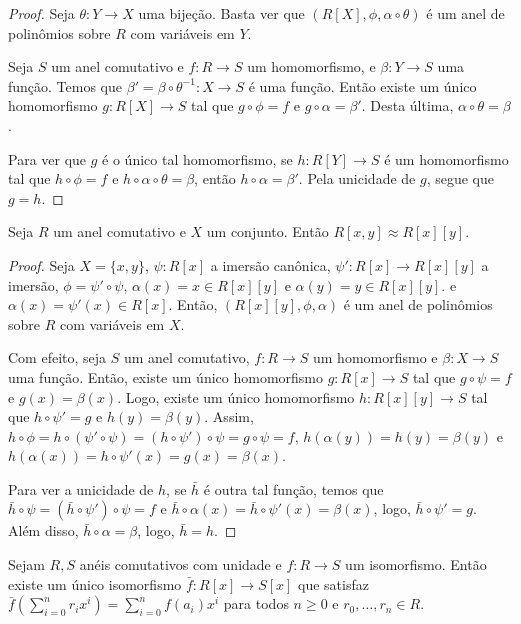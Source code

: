 \begin{proof}
Seja $\theta:Y\rightarrow X$ uma bijeção. Basta ver que $(R[X], \phi, \alpha\circ \theta)$ é um anel de polinômios sobre $R$ com variáveis em $Y$.

Seja $S$ um anel comutativo e $f:R\rightarrow S$ um homomorfismo, e $\beta:Y\rightarrow S$ uma função.
Temos que $\beta'=\beta\circ \theta^{-1}:X\rightarrow S$ é uma função.
Então existe um único homomorfismo $g: R[X]\rightarrow S$ tal que $g\circ \phi=f$ e $g\circ \alpha=\beta'$.
Desta última, $\alpha\circ \theta=\beta$.

Para ver que $g$ é o único tal homomorfismo, se $h: R[Y]\rightarrow S$ é um homomorfismo tal que $h\circ \phi=f$ e $h\circ \alpha\circ \theta=\beta$, então $h\circ \alpha=\beta'$.
Pela unicidade de $g$, segue que $g=h$.
\end{proof}
\begin{prop}
    Seja $R$ um anel comutativo e $X$ um conjunto. Então $R[x, y]\approx R[x][y]$.
\end{prop}
\begin{proof}
    Seja $X=\{x, y\}$, $\psi:R[x]$ a imersão canônica, $\psi': R[x]\rightarrow R[x][y]$ a imersão, $\phi=\psi'\circ \psi$, $\alpha(x)=x\in R[x][y]$ e $\alpha(y)=y\in R[x][y]$. e $\alpha(x)=\psi'(x)\in R[x]$.
    Então, $(R[x][y], \phi, \alpha)$ é um anel de polinômios sobre $R$ com variáveis em $X$.

    Com efeito, seja $S$ um anel comutativo, $f:R\rightarrow S$ um homomorfismo e $\beta:X\rightarrow S$ uma função.
    Então, existe um único homomorfismo $g:R[x]\rightarrow S$ tal que $g\circ \psi=f$ e $g(x)=\beta(x)$.
    Logo, existe um único homomorfismo $h:R[x][y]\rightarrow S$ tal que $h\circ \psi'=g$ e $h(y)=\beta(y)$.
    Assim, $h\circ \phi=h\circ(\psi'\circ \psi)=(h\circ \psi')\circ \psi=g\circ \psi=f$, $h(\alpha(y))=h(y)=\beta(y)$ e $h(\alpha(x))=h\circ \psi'(x)=g(x)=\beta(x)$.

    Para ver a unicidade de $h$, se $\bar h$ é outra tal função, temos que $\bar h\circ \psi=(\bar h\circ \psi')\circ \psi=f$ e $\bar h\circ \alpha(x)=\bar h\circ \psi'(x)=\beta(x)$, logo, $\bar h\circ \psi'=g$.
    Além disso, $\bar h\circ \alpha=\beta$, logo, $\bar h=h$.
\end{proof}

\begin{corol}
Sejam $R, S$ anéis comutativos com unidade e $f: R\rightarrow S$ um isomorfismo.
Então existe um único isomorfismo $\bar f:R[x]\rightarrow S[x]$ que satisfaz $\bar f(\sum_{i=0}^n r_ix^i)=\sum_{i=0}^nf(a_i)x^i$ para todos $n\geq 0$ e $r_0, \dots, r_n\in R$.
\end{corol}

